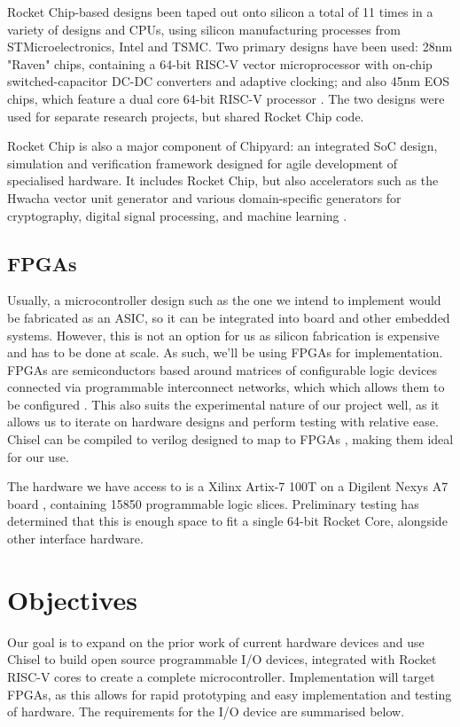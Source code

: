 \documentclass[a4paper,fleqn,12pt]{article}
\begin{document}
Rocket Chip-based designs been taped out onto silicon a total of 11 times in a variety of designs and CPUs, using silicon manufacturing processes from STMicroelectronics, Intel and TSMC. Two primary designs have been used: 28nm "Raven" chips, containing a 64-bit RISC-V
vector microprocessor with on-chip switched-capacitor DC-DC converters and adaptive clocking; and also 45nm EOS chips, which feature a dual core 64-bit RISC-V processor \citep{rv2core}. The two designs were used for separate research projects, but shared Rocket Chip code.

Rocket Chip is also a major component of Chipyard: an integrated SoC design, simulation and verification framework designed for agile development of specialised hardware. It includes Rocket Chip, but also accelerators such as the Hwacha vector unit generator and various domain-specific generators for cryptography, digital signal processing, and machine learning \citep{chipyard}.

\subsection{FPGAs}

Usually, a microcontroller design such as the one we intend to implement would be fabricated as an ASIC, so it can be integrated into board and other embedded systems. However, this is not an option for us as silicon fabrication is expensive and has to be done at scale. As such, we'll be using FPGAs for implementation. FPGAs are semiconductors based around matrices of configurable logic devices connected via programmable interconnect networks, which which allows them to be configured  \citep{whatisfpga}. This also suits the experimental nature of our project well, as it allows us to iterate on hardware designs and perform testing with relative ease. Chisel can be compiled to verilog designed to map to FPGAs \citep{chisel}, making them ideal for our use.

The hardware we have access to is a Xilinx Artix-7 100T on a Digilent Nexys A7 board \citep{digilent}, containing 15850 programmable logic slices. Preliminary testing has determined that this is enough space to fit a single 64-bit Rocket Core, alongside other interface hardware.

\section{Objectives}
Our goal is to expand on the prior work of current hardware devices and use Chisel to build open source programmable I/O devices, integrated with Rocket RISC-V cores to create a complete microcontroller. Implementation will target FPGAs, as this allows for rapid prototyping and easy implementation and testing of hardware. The requirements for the I/O device are summarised below.
\end{document}
